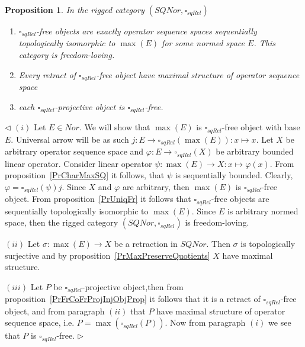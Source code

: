 \documentclass[12pt]{article}
\newtheorem{proposition}[theorem]{Proposition}
\newenvironment{proof}{\par $\triangleleft$}{$\triangleright$}
\begin{document}
\begin{proposition}\label{PrSQRelChar}
In the rigged category $(SQNor,\square_{sqRel})$
\begin{enumerate}[label = (\roman*)]
    \item $\square_{sqRel}$-free objects are exactly operator sequence spaces 
    sequentially topologically isomorphic to $\max(E)$ for some normed 
    space $E$. This category is freedom-loving. 

    \item Every retract of $\square_{sqRel}$-free object have maximal 
    structure of operator sequence space

    \item each $\square_{sqRel}$-projective object is $\square_{sqRel}$-free.
\end{enumerate}
\end{proposition}
\begin{proof}
$(i)$ Let $E\in Nor$. We will show that $\max(E)$ is $\square_{sqRel}$-free 
object with base $E$. Universal  arrow will be as 
such $j:E\to\square_{sqRel}(\max(E)):x\mapsto x$. Let $X$ be arbitrary operator 
sequence space and $\varphi:E\to\square_{sqRel}(X)$ be arbitrary bounded 
linear operator. Consider linear 
operator $\psi: \max(E)\to X:x\mapsto\varphi(x)$. 
From proposition~\ref{PrCharMaxSQ} 
it follows, that $\psi$ is sequentially bounded. 
Clearly, $\varphi=\square_{sqRel}(\psi)j$.
Since $X$ and $\varphi$ are arbitrary, then $\max(E)$ is $\square_{sqRel}$-free 
object. From proposition~\ref{PrUniqFr} it follows that $\square_{sqRel}$-free 
objects are sequentially topologically isomorphic to 
$\max(E)$. Since $E$ is arbitrary normed space, then the rigged 
category $(SQNor,\square_{sqRel})$ is freedom-loving.

$(ii)$ Let $\sigma:\max(E)\to X$ be a retraction in $SQNor$. Then $\sigma$ is 
topologically surjective and by 
proposition~\ref{PrMaxPreserveQuotients} $X$ have maximal structure.

$(iii)$ Let $P$ be $\square_{sqRel}$-projective object,then from 
proposition~\ref{PrFrCoFrProjInjObjProp} it follows that it is a 
retract of $\square_{sqRel}$-free object, and from paragraph $(ii)$ 
that $P$ have maximal structure of operator sequence 
space, i.e. $P=\max(\square_{sqRel}(P))$. Now from 
paragraph $(i)$ we see that $P$ is $\square_{sqRel}$-free.  
\end{proof}
\end{document}
